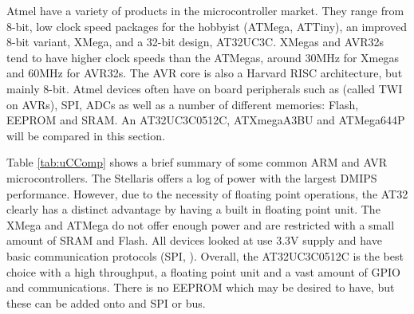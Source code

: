 Atmel have a variety of products in the microcontroller market. They range from 8-bit, low clock speed packages for the hobbyist (ATMega, ATTiny), an improved 8-bit variant, XMega, and a 32-bit design, AT32UC3C. XMegas and AVR32s tend to have higher clock speeds than the ATMegas, around 30MHz for Xmegas and 60MHz for AVR32s. The AVR core is also a Harvard RISC architecture, but mainly 8-bit. Atmel devices often have on board peripherals such as \itc (called TWI on AVRs), SPI, ADCs as well as a number of different memories: Flash, EEPROM and SRAM. An AT32UC3C0512C, ATXmegaA3BU and ATMega644P will be compared in this section. 


Table \ref{tab:uCComp} shows a brief summary of some common ARM and AVR microcontrollers. The Stellaris offers a log of  power with the largest DMIPS performance. However, due to the necessity of floating point operations, the AT32 clearly has a distinct advantage by having a built in floating point unit. The XMega and ATMega do not offer enough power and are restricted with a small amount of SRAM and Flash. All devices looked at use 3.3V supply and have basic communication protocols (SPI, \itc). Overall, the AT32UC3C0512C is the best choice with a high throughput, a floating point unit and a vast amount of GPIO and communications. There is no EEPROM which may be desired to have, but these can be added onto and SPI or \itc bus. 

